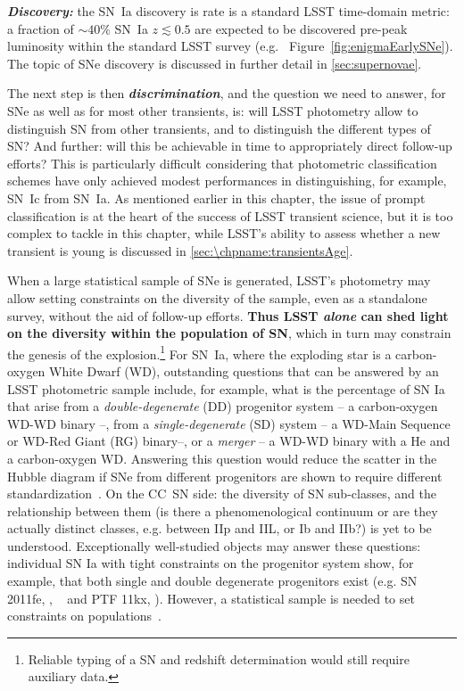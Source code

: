 {\bf \emph{Discovery:}} the SN~Ia discovery is rate is a standard LSST time-domain metric: a
fraction of $\sim40\%$ SN~Ia $z\lesssim0.5$ are expected to be discovered pre-peak
luminosity within the standard LSST survey
(e.g. ~Figure~\ref{fig:enigmaEarlySNe}). The
topic of SNe discovery is discussed in further detail in
\ref{sec:supernovae}.

The next step is then {\bf\emph{discrimination}}, and the question we need
to answer, for SNe as well as for most other transients, is: will LSST
photometry allow to distinguish SN from other transients, and to
distinguish the different types of SN? And further: will this be
achievable in time to appropriately direct follow-up efforts? This is
particularly difficult considering that photometric classification
schemes have only achieved modest performances in distinguishing, for
example, SN~Ic from SN~Ia. As mentioned earlier in this chapter, the issue
of prompt classification is at the heart of the success of LSST
transient science, but it is too complex to tackle in this chapter,
while LSST's ability to assess whether a new transient is young is discussed
in \autoref{sec:\chpname:transientsAge}.

When a large statistical sample of SNe is generated, LSST's photometry
may allow setting constraints on the diversity of the sample, even as a
standalone survey, without the aid of follow-up efforts.  {\bf Thus
  LSST \emph{alone} can shed light on the diversity within the
  population of SN}, which in turn may constrain the genesis of the
explosion.\footnote{Reliable typing of a SN and redshift determination
  would still require auxiliary data.} For SN~Ia, where the exploding
star is a carbon-oxygen White Dwarf (WD), outstanding questions
that can be answered by an LSST photometric sample include, for
example, what is the percentage of SN Ia that arise from a
\emph{double-degenerate} (DD) progenitor system -- a carbon-oxygen WD-WD binary
--, from a \emph {single-degenerate} (SD) system -- a WD-Main Sequence
 or WD-Red Giant (RG) binary--, or a \emph{merger} -- a WD-WD
 binary with a He and a carbon-oxygen WD.
 Answering this question would reduce the
scatter in the Hubble diagram if SNe from different progenitors are
shown to require different standardization~\citep{Scolnic2014}. On the
CC~SN side: the diversity of SN sub-classes, and the relationship
between them (is there a phenomenological continuum or are they actually
distinct classes, e.g. between IIp and IIL, or Ib and IIb?) is yet to
be understood. Exceptionally well-studied objects may answer these
questions: individual SN Ia with tight constraints on the progenitor
system show, for example, that both single and double degenerate
progenitors exist (e.g. SN 2011fe, \citealt{Li11}, ~\citealt{Olling15}
and PTF 11kx, \citealt{Dilday12}). However, a statistical sample is
needed to set constraints on populations~\citep{Hayden2010, Bianco11}.

